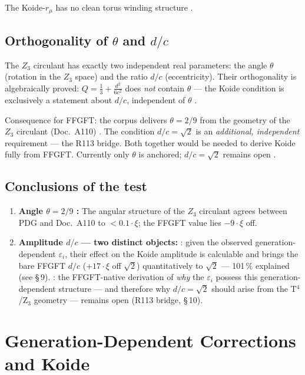 The Koide-$r_\mu$ has no clean torus winding structure \SM.

\subsection*{Orthogonality of $\theta$ and $d/c$ \BM}

The $Z_3$ circulant has exactly two independent real parameters: the angle $\theta$
(rotation in the $Z_3$ space) and the ratio $d/c$ (eccentricity). Their orthogonality
is algebraically proved: $Q = \tfrac{1}{3} + \tfrac{d^2}{6c^2}$ does \emph{not}
contain $\theta$ --- the Koide condition is exclusively a statement about $d/c$,
independent of $\theta$ \BM.

Consequence for FFGFT: the corpus delivers $\theta = 2/9$ from the geometry of the
$Z_3$ circulant (Doc.~A110) \KM. The condition $d/c = \sqrt{2}$ is an \emph{additional,
independent} requirement --- the R113 bridge. Both together would be needed to derive
Koide fully from FFGFT. Currently only $\theta$ is anchored; $d/c = \sqrt{2}$ remains
open \SM.

\subsection*{Conclusions of the test}

\begin{enumerate}\itemsep4pt
\item \textbf{Angle $\theta = 2/9$ \KM:} The angular structure of the $Z_3$ circulant
  agrees between PDG and Doc.~A110 to $< 0.1\cdot\xi$; the FFGFT value lies $-9\cdot\xi$ off.
\item \textbf{Amplitude $d/c$ --- two distinct objects:} \KM: given the observed
  generation-dependent $\varepsilon_i$, their effect on the Koide amplitude is
  calculable and brings the bare FFGFT $d/c$ ($+17\cdot\xi$ off $\sqrt{2}$)
  quantitatively to $\sqrt{2}$ --- 101\,\% explained (see §\,9).
  \SM: the FFGFT-native derivation of \emph{why} the $\varepsilon_i$ possess this
  generation-dependent structure --- and therefore why $d/c = \sqrt{2}$ should
  arise from the T$^4$/Z$_3$ geometry --- remains open (R113 bridge, §\,10).
\end{enumerate}

\section{Generation-Dependent Corrections and Koide}

